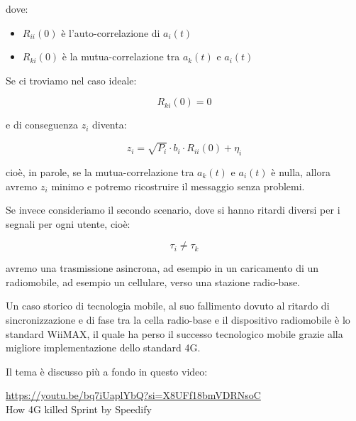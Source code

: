 dove: 

\begin{itemize}
    \item $R_{ii} (0)$ è l'auto-correlazione di $a_i (t)$
    \item $R_{ki} (0)$ è la mutua-correlazione tra $a_k (t)$ e $a_i (t)$
\end{itemize} 

Se ci troviamo nel caso ideale: 

{
    \Large 
    \begin{equation}
        R_{ki} (0) = 0
    \end{equation}
} 

e di conseguenza $z_i$ diventa: 

{
    \Large 
    \begin{equation}
        z_i = \sqrt{P_i} \cdot b_i \cdot R_{ii} (0) + \eta_i
    \end{equation}
}

cioè, in parole, se la mutua-correlazione tra $a_k (t)$ e $a_i (t)$ è nulla, 
allora avremo $z_i$ minimo e potremo ricostruire il messaggio senza problemi. \newline 

Se invece consideriamo il secondo scenario, 
dove si hanno ritardi diversi per i segnali per ogni utente, 
cioè: 

{
    \Large 
    \begin{equation}
        \tau_i \neq \tau_k
    \end{equation}
}

avremo una trasmissione asincrona, 
ad esempio in un caricamento di un radiomobile, 
ad esempio un cellulare, 
verso una stazione radio-base. \newline 

\begin{tcolorbox}
    Un caso storico di tecnologia mobile,  
    al suo fallimento dovuto al ritardo di sincronizzazione e di fase 
    tra la cella radio-base e il dispositivo radiomobile  
    è lo standard WiiMAX, 
    il quale ha perso il successo tecnologico mobile  
    grazie alla migliore implementazione dello standard 4G. \newline 
    
    Il tema è discusso più a fondo in questo video: \newline 

    \url{https://youtu.be/bq7iUaplYbQ?si=X8UFf18bmVDRNsoC} \\ How 4G killed Sprint by Speedify
\end{tcolorbox}

